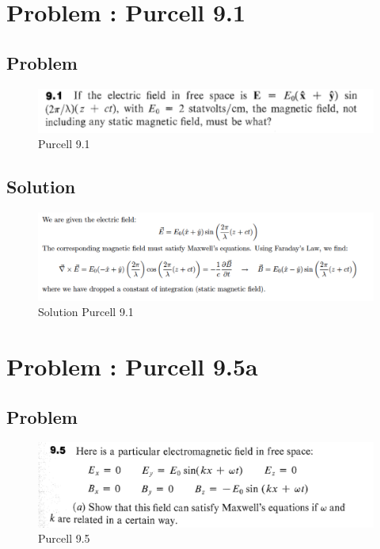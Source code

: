\documentclass[solutions]{esg8022pset}
\date{\today }
\begin{document}
\section{Problem \thesection: Purcell 9.1}
\subsection{Problem}

\begin{figure}[H]
    \centering
    \includegraphics[width = 15cm]{pu901}
    \caption{Purcell 9.1}
  \end{figure}
  
\subsection{Solution}
  \begin{figure}[H]
    \centering
    \includegraphics[width = 15cm]{solpu901}
    \caption{Solution Purcell 9.1}
  \end{figure}
\section{Problem \thesection: Purcell 9.5a}
\subsection{Problem}
 \begin{figure}[H]
    \centering
    \includegraphics[width = 15cm]{pu905}
    \caption{Purcell 9.5}
  \end{figure}
\end{document}
